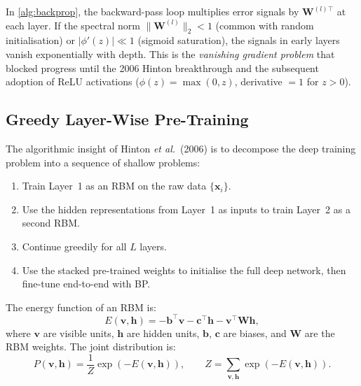 \documentclass[12pt,a4paper]{article}
\begin{document}
\begin{keyinsight}[title=Why BP Fails in Deep Networks]
In \cref{alg:backprop}, the backward-pass loop multiplies error signals
by $\mathbf{W}^{(l)\top}$ at each layer.  If the spectral norm
$\|\mathbf{W}^{(l)}\|_2 < 1$ (common with random initialisation) or
$|\phi'(z)| \ll 1$ (sigmoid saturation), the signals in early layers
vanish exponentially with depth.  This is the \emph{vanishing gradient
problem} that blocked progress until the 2006 Hinton breakthrough and the
subsequent adoption of ReLU activations ($\phi(z) = \max(0,z)$, derivative
$= 1$ for $z>0$).
\end{keyinsight}

\subsection{Greedy Layer-Wise Pre-Training}
\label{subsec:greedy}

The algorithmic insight of Hinton \emph{et al.}\ (2006) is to decompose the
deep training problem into a sequence of shallow problems:

\begin{enumerate}
  \item Train Layer~1 as an RBM on the raw data $\{\mathbf{x}_i\}$.
  \item Use the hidden representations from Layer~1 as inputs to train
        Layer~2 as a second RBM.
  \item Continue greedily for all $L$ layers.
  \item Use the stacked pre-trained weights to initialise the full deep
        network, then fine-tune end-to-end with BP.
\end{enumerate}

The energy function of an RBM is:
\begin{equation}
  \label{eq:rbm_energy}
  E(\mathbf{v}, \mathbf{h}) = -\mathbf{b}^\top \mathbf{v}
                              - \mathbf{c}^\top \mathbf{h}
                              - \mathbf{v}^\top \mathbf{W} \mathbf{h},
\end{equation}
where $\mathbf{v}$ are visible units, $\mathbf{h}$ are hidden units,
$\mathbf{b}$, $\mathbf{c}$ are biases, and $\mathbf{W}$ are the RBM weights.
The joint distribution is:
\begin{equation}
  \label{eq:rbm_joint}
  P(\mathbf{v},\mathbf{h}) = \frac{1}{Z}\exp\!\left(-E(\mathbf{v},\mathbf{h})\right),
  \qquad Z = \sum_{\mathbf{v},\mathbf{h}} \exp\!\left(-E(\mathbf{v},\mathbf{h})\right).
\end{equation}
\end{document}
